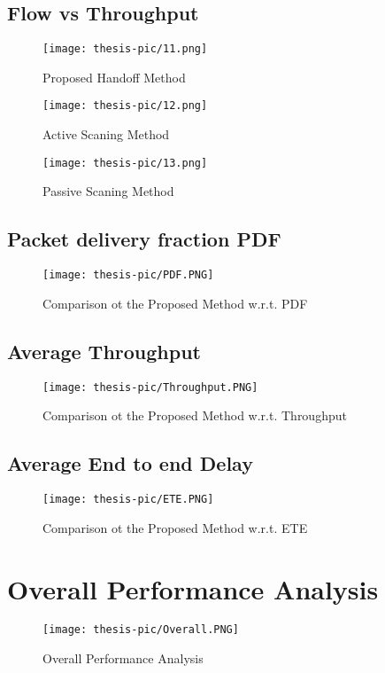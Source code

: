 \documentclass[12pt,a4paper]{report}
\begin{document}
\subsection{Flow vs Throughput}
\begin{figure}[H]
\centering
\texttt{[image: thesis-pic/11.png]}
\caption{Proposed Handoff Method}
\end{figure}
\begin{figure}[H]
\centering
\texttt{[image: thesis-pic/12.png]}
\caption{Active Scaning Method}
\end{figure}
\begin{figure}[H]
\centering
\texttt{[image: thesis-pic/13.png]}
\caption{Passive Scaning Method}
\end{figure}
\subsection{Packet delivery fraction PDF}
\begin{figure}[H]
\centering
\texttt{[image: thesis-pic/PDF.PNG]}
\caption{Comparison ot the Proposed Method w.r.t. PDF}
\end{figure}
\subsection{Average Throughput}

\begin{figure}[H]
\centering
\texttt{[image: thesis-pic/Throughput.PNG]}
\caption{Comparison ot the Proposed Method w.r.t. Throughput}
\end{figure}
\subsection{Average End to end Delay}
\begin{figure}[H]
\centering
\texttt{[image: thesis-pic/ETE.PNG]}
\caption{Comparison ot the Proposed Method w.r.t. ETE}
\end{figure}
\section{Overall Performance Analysis}
\begin{figure}[H]
\centering
\texttt{[image: thesis-pic/Overall.PNG]}
\caption{Overall Performance Analysis}
\end{figure}
\end{document}
